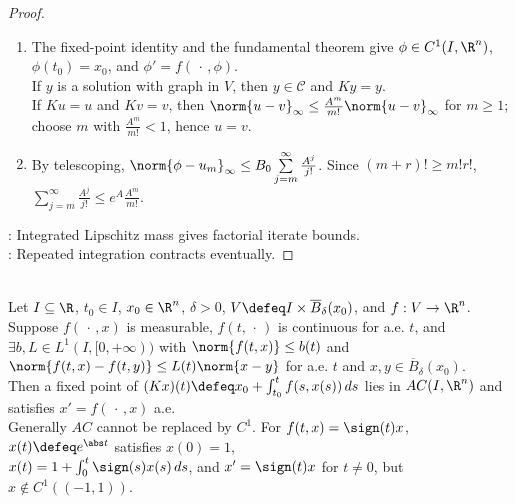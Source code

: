 \begin{theorem}
\begin{proof}
\begin{enumerate}[label=(\roman*)]
\item The fixed-point identity and the fundamental theorem give $\phi\in C^1(I,\R^n)$, $\phi(t_0)=x_0$, and $\phi'=f(\,\cdot\,,\phi)$.\\
If $y$ is a solution with graph in $V$, then $y\in\mathcal C$ and $Ky=y$.\\
If $Ku=u$ and $Kv=v$, then $\norm{u-v}_\infty\leq\frac{A^m}{m!}\norm{u-v}_\infty$ for $m\geq1$; choose $m$ with $\frac{A^m}{m!}<1$, hence $u=v$.
\item By telescoping, $\norm{\phi-u_m}_\infty\leq B_0\sum\limits_{j=m}^{\infty}\frac{A^j}{j!}$. Since $(m+r)!\geq m!r!$, $\sum\limits_{j=m}^{\infty}\frac{A^j}{j!}\leq e^A\frac{A^m}{m!}$.
\end{enumerate}
: Integrated Lipschitz mass gives factorial iterate bounds.\\
: Repeated integration contracts eventually.
\end{proof}
\end{theorem}

\begin{remark} \label{rem:caratheodory-ode-solutions} \\
Let $I\subseteq\R$, $t_0\in I$, $x_0\in\R^n$, $\delta>0$, $V\defeq I\times\overline B_\delta(x_0)$, and $f:V\to\R^n$.\\
Suppose $f(\,\cdot\,,x)$ is measurable, $f(t,\,\cdot\,)$ is continuous for a.e. $t$, and $\exists b,L\in L^1(I,[0,+\infty))$ with $\norm{f(t,x)}\leq b(t)$ and $\norm{f(t,x)-f(t,y)}\leq L(t)\norm{x-y}$ for a.e. $t$ and $x,y\in\overline B_\delta(x_0)$.\\
Then a fixed point of $(Kx)(t)\defeq x_0+\int_{t_0}^tf(s,x(s))\,ds$ lies in $AC(I,\R^n)$ and satisfies $x'=f(\,\cdot\,,x)$ a.e.\\
Generally $AC$ cannot be replaced by $C^1$. For $f(t,x)=\sign(t)x$, $x(t)\defeq e^{\abs t}$ satisfies $x(0)=1$,\\
$x(t)=1+\int_0^t\sign(s)x(s)\,ds$, and $x'=\sign(t)x$ for $t\neq0$, but $x\notin C^1((-1,1))$.
\end{remark}

